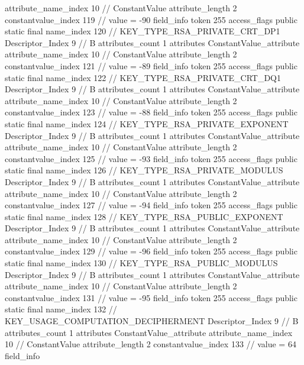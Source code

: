 {{{{{{{					attribute_name_index	10		// ConstantValue
					attribute_length	2
					constantvalue_index	119		// value = -90
				}
				}
			}
			field_info {
				token	255
				access_flags	public static final
				name_index	120		// KEY_TYPE_RSA_PRIVATE_CRT_DP1
				Descriptor_Index	9		// B
				attributes_count	1
				attributes {
				ConstantValue_attribute {
					attribute_name_index	10		// ConstantValue
					attribute_length	2
					constantvalue_index	121		// value = -89
				}
				}
			}
			field_info {
				token	255
				access_flags	public static final
				name_index	122		// KEY_TYPE_RSA_PRIVATE_CRT_DQ1
				Descriptor_Index	9		// B
				attributes_count	1
				attributes {
				ConstantValue_attribute {
					attribute_name_index	10		// ConstantValue
					attribute_length	2
					constantvalue_index	123		// value = -88
				}
				}
			}
			field_info {
				token	255
				access_flags	public static final
				name_index	124		// KEY_TYPE_RSA_PRIVATE_EXPONENT
				Descriptor_Index	9		// B
				attributes_count	1
				attributes {
				ConstantValue_attribute {
					attribute_name_index	10		// ConstantValue
					attribute_length	2
					constantvalue_index	125		// value = -93
				}
				}
			}
			field_info {
				token	255
				access_flags	public static final
				name_index	126		// KEY_TYPE_RSA_PRIVATE_MODULUS
				Descriptor_Index	9		// B
				attributes_count	1
				attributes {
				ConstantValue_attribute {
					attribute_name_index	10		// ConstantValue
					attribute_length	2
					constantvalue_index	127		// value = -94
				}
				}
			}
			field_info {
				token	255
				access_flags	public static final
				name_index	128		// KEY_TYPE_RSA_PUBLIC_EXPONENT
				Descriptor_Index	9		// B
				attributes_count	1
				attributes {
				ConstantValue_attribute {
					attribute_name_index	10		// ConstantValue
					attribute_length	2
					constantvalue_index	129		// value = -96
				}
				}
			}
			field_info {
				token	255
				access_flags	public static final
				name_index	130		// KEY_TYPE_RSA_PUBLIC_MODULUS
				Descriptor_Index	9		// B
				attributes_count	1
				attributes {
				ConstantValue_attribute {
					attribute_name_index	10		// ConstantValue
					attribute_length	2
					constantvalue_index	131		// value = -95
				}
				}
			}
			field_info {
				token	255
				access_flags	public static final
				name_index	132		// KEY_USAGE_COMPUTATION_DECIPHERMENT
				Descriptor_Index	9		// B
				attributes_count	1
				attributes {
				ConstantValue_attribute {
					attribute_name_index	10		// ConstantValue
					attribute_length	2
					constantvalue_index	133		// value = 64
				}
				}
			}
			field_info {
}}}}}
